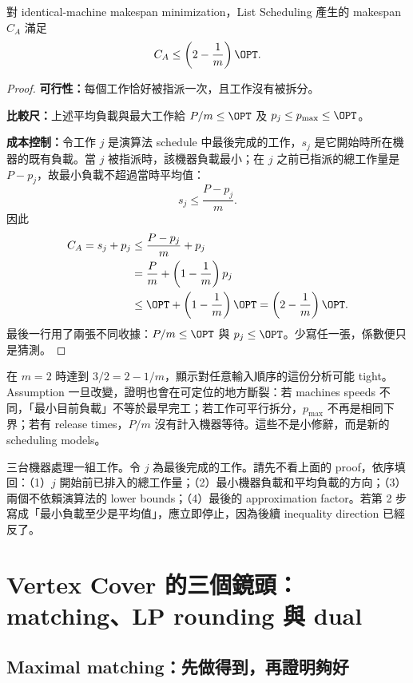 \documentclass[11pt,a4paper,oneside,openany]{book}
\begin{document}
\begin{theorem}
對 identical-machine makespan minimization，List Scheduling 產生的 makespan $C_A$ 滿足
\[
 C_A\le\left(2-\frac1m\right)\OPT.
\]
\end{theorem}
\begin{proof}
\textbf{可行性：}每個工作恰好被指派一次，且工作沒有被拆分。

\textbf{比較尺：}上述平均負載與最大工作給 $P/m\le\OPT$ 及 $p_j\le p_{\max}\le\OPT$。

\textbf{成本控制：}令工作 $j$ 是演算法 schedule 中最後完成的工作，$s_j$ 是它開始時所在機器的既有負載。當 $j$ 被指派時，該機器負載最小；在 $j$ 之前已指派的總工作量是 $P-p_j$，故最小負載不超過當時平均值：
\[
 s_j\le\frac{P-p_j}{m}.
\]
因此
\begin{align*}
 C_A=s_j+p_j
 &\le \frac{P-p_j}{m}+p_j\\
 &=\frac{P}{m}+\left(1-\frac1m\right)p_j\\
 &\le \OPT+\left(1-\frac1m\right)\OPT
 =\left(2-\frac1m\right)\OPT.
\end{align*}
最後一行用了兩張不同收據：$P/m\le\OPT$ 與 $p_j\le\OPT$。少寫任一張，係數便只是猜測。
\end{proof}

 在 $m=2$ 時達到 $3/2=2-1/m$，顯示對任意輸入順序的這份分析可能 tight。Assumption 一旦改變，證明也會在可定位的地方斷裂：若 machines speeds 不同，「最小目前負載」不等於最早完工；若工作可平行拆分，$p_{\max}$ 不再是相同下界；若有 release times，$P/m$ 沒有計入機器等待。這些不是小修辭，而是新的 scheduling models。

\begin{example}
三台機器處理一組工作。令 $j$ 為最後完成的工作。請先不看上面的 proof，依序填回：（1）$j$ 開始前已排入的總工作量；（2）最小機器負載和平均負載的方向；（3）兩個不依賴演算法的 lower bounds；（4）最後的 approximation factor。若第 2 步寫成「最小負載至少是平均值」，應立即停止，因為後續 inequality direction 已經反了。
\end{example}

\section{Vertex Cover 的三個鏡頭：matching、LP rounding 與 dual}
\subsection{Maximal matching：先做得到，再證明夠好}
\end{document}
